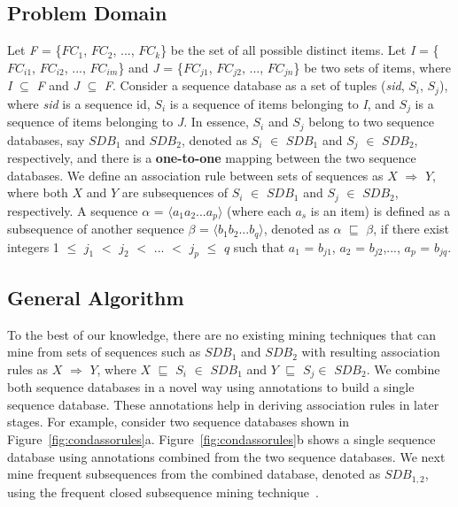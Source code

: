 \subsection*{Problem Domain}\vspace*{-2ex}
Let \emph{F} = \{$FC_1$, $FC_2$, ..., $FC_k$\} be the set of all possible distinct items. 
Let \emph{I} = \{$FC_{i1}$, $FC_{i2}$, ..., $FC_{im}$\} and \emph{J} = \{$FC_{j1}$, $FC_{j2}$, ..., $FC_{jn}$\}
be two sets of items, where \emph{I} $\subseteq$ \emph{F} and \emph{J} $\subseteq$ \emph{F}.
Consider a sequence database as a set of tuples (\emph{sid}, $S_i$, $S_j$), where 
\emph{sid} is a sequence id, $S_i$ is a sequence of items belonging to \emph{I}, and $S_j$ is a sequence of items
belonging to \emph{J}. 
In essence, $S_i$ and $S_j$ belong to two sequence databases, say $SDB_1$ and $SDB_2$, 
denoted as $S_i$ $\in$ $SDB_1$ and $S_j$ $\in$ $SDB_2$,
respectively, and there is a \textbf{one-to-one} mapping between the two sequence databases.
We define an association rule between sets of sequences as 
$X$ $\Rightarrow$ $Y$, where both $X$ and $Y$ are subsequences of $S_i$ $\in$ $SDB_1$ and $S_j$ $\in$ $SDB_2$, respectively. A sequence $\alpha$ = $\langle$$a_{1}$$a_{2}$...$a_{p}$$\rangle$ 
(where each $a_{s}$ is an item)
is defined as a subsequence of another sequence $\beta$ = $\langle$$b_{1}$$b_{2}$...$b_{q}$$\rangle$, 
denoted as $\alpha$ $\sqsubseteq$ $\beta$, if there exist integers 
1 $\le$ $j_{1}$ $<$ $j_{2}$ $<$ ... $<$ $j_{p}$ $\le$ $q$ such that
$a_{1}$ = $b_{j1}$, $a_{2}$ = $b_{j2}$,..., $a_{p}$ = $b_{jq}$.
\vspace*{-2ex}
\subsection*{General Algorithm}\vspace*{-2ex}

To the best of our knowledge, there are no existing 
mining techniques that can mine from sets of sequences such as $SDB_1$ and $SDB_2$ with
resulting association rules as $X$ $\Rightarrow$ $Y$, where $X$ $\sqsubseteq$
$S_i$ $\in$ $SDB_1$ and $Y$ $\sqsubseteq$ $S_j \in$ $SDB_2$. 
We combine both sequence databases in a novel way 
using annotations to build a single sequence database. These annotations help in deriving
association rules in later stages. For example, consider two sequence databases shown 
in Figure~\ref{fig:condassorules}a. Figure~\ref{fig:condassorules}b shows a 
single sequence database using annotations combined from the two sequence databases.
We next mine frequent subsequences from the combined database, denoted as $SDB_{1,2}$, using the
frequent closed subsequence mining technique~\cite{wang:bide}.

